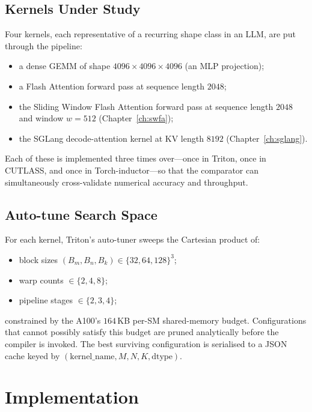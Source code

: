 \subsection{Kernels Under Study}\label{sec:triton_kernels}
Four kernels, each representative of a recurring shape class in
an LLM, are put through the pipeline:
\begin{itemize}
    \item a dense GEMM of shape $4096 \times 4096 \times 4096$
          (an MLP projection);
    \item a Flash Attention forward pass at sequence length
          $2048$;
    \item the Sliding Window Flash Attention forward pass at
          sequence length $2048$ and window $w = 512$
          (Chapter~\ref{ch:swfa});
    \item the SGLang decode-attention kernel at KV length $8192$
          (Chapter~\ref{ch:sglang}).
\end{itemize}
Each of these is implemented three times over---once in Triton,
once in CUTLASS, and once in Torch-inductor---so that the
comparator can simultaneously cross-validate numerical accuracy
and throughput.

\subsection{Auto-tune Search Space}\label{sec:triton_search}
For each kernel, Triton's auto-tuner sweeps the Cartesian product
of:
\begin{itemize}
    \item block sizes $(B_m, B_n, B_k) \in \{32,64,128\}^3$;
    \item warp counts $\in \{2, 4, 8\}$;
    \item pipeline stages $\in \{2, 3, 4\}$;
\end{itemize}
constrained by the A100's $164$\,KB per-SM shared-memory budget.
Configurations that cannot possibly satisfy this budget are
pruned analytically before the compiler is invoked. The best
surviving configuration is serialised to a JSON cache keyed by
$(\text{kernel\_name}, M, N, K, \text{dtype})$.

\section{Implementation}\label{sec:triton_impl}

